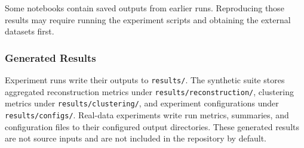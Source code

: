 Some notebooks contain saved outputs from earlier runs. Reproducing those results may require running the experiment scripts and obtaining the external datasets first.

\subsubsection{Generated Results}

Experiment runs write their outputs to \texttt{results/}. The synthetic suite stores aggregated reconstruction metrics under \texttt{results/reconstruction/}, clustering metrics under \texttt{results/clustering/}, and experiment configurations under \texttt{results/configs/}. Real-data experiments write run metrics, summaries, and configuration files to their configured output directories. These generated results are not source inputs and are not included in the repository by default.
